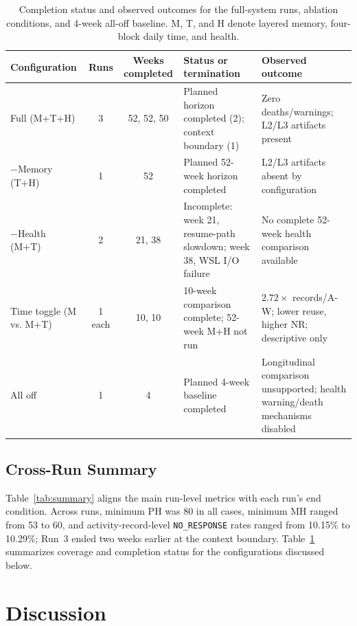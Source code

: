 \documentclass[11pt]{article}
\begin{document}
\begin{table}[!t]
\centering
\caption{Completion status and observed outcomes for the full-system runs, ablation conditions, and 4-week all-off baseline. M, T, and H denote layered memory, four-block daily time, and health.}
\label{tab:ablation}
\footnotesize
\setlength{\tabcolsep}{4pt}
\begin{tabular}{@{}p{2.7cm}ccp{3.4cm}p{5.3cm}@{}}
\toprule
Configuration & Runs & Weeks completed & Status or termination & Observed outcome \\
\midrule
Full (M+T+H)  & 3 & 52, 52, 50 & Planned horizon completed (2); context boundary (1) & Zero deaths/warnings; L2/L3 artifacts present \\
$-$Memory (T+H) & 1 & 52 & Planned 52-week horizon completed & L2/L3 artifacts absent by configuration \\
$-$Health (M+T) & 2 & 21, 38 & Incomplete: week 21, resume-path slowdown; week 38, WSL I/O failure & No complete 52-week health comparison available \\
Time toggle (M vs. M+T) & 1 each & 10, 10 & 10-week comparison complete; 52-week M+H not run & $2.72\times$ records/A-W; lower reuse, higher NR; descriptive only \\
All off & 1 & 4 & Planned 4-week baseline completed & Longitudinal comparison unsupported; health warning/death mechanisms disabled \\
\bottomrule
\end{tabular}
\end{table}

\subsection{Cross-Run Summary}

Table~\ref{tab:summary} aligns the main run-level metrics with each run's end condition.
Across runs, minimum PH was 80 in all cases, minimum MH ranged from 53 to 60, and activity-record-level \texttt{NO\_RESPONSE} rates ranged from 10.15\% to 10.29\%; Run~3 ended two weeks earlier at the context boundary.
Table~\ref{tab:ablation} summarizes coverage and completion status for the configurations discussed below.

\FloatBarrier

\section{Discussion}
\end{document}

